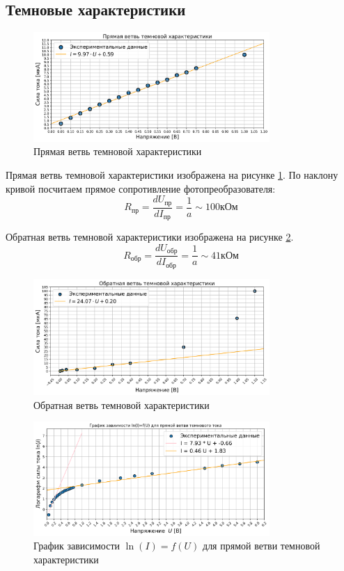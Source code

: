 \documentclass[a4paper, 12pt]{extarticle}
\begin{document}
\subsection*{\textcolor{sub_header}{Темновые характеристики}}
\begin{figure}[htbp]
    \centering
    \includegraphics[width = 0.8\textwidth]{pics/dark_straight.png}
    \caption{Прямая ветвь темновой характеристики}
    \label{fig:dark_straight}
\end{figure}

Прямая ветвь темновой характеристики изображена на рисунке \ref{fig:dark_straight}. По наклону кривой посчитаем прямое сопротивление фотопреобразователя:
$$
R_{\text{пр}} = \frac{d U_{\text{пр}}}{d I_{\text{пр}}} = \frac{1}{a} \sim 100 \text{кОм}
$$

Обратная ветвь темновой характеристики изображена на рисунке \ref{fig:dark_back}.
$$
R_{\text{обр}} = \frac{d U_{\text{обр}}}{d I_{\text{обр}}} = \frac{1}{a} \sim 41 \text{кОм} 
$$

\begin{figure}[htbp]
    \centering
    \includegraphics[width = 0.8\textwidth]{pics/dark_back.png}
    \caption{Обратная ветвь темновой характеристики}
    \label{fig:dark_back}
\end{figure}


\begin{figure}[htbp]
    \centering
    \includegraphics[width=0.8\textwidth]{pics/ln.png}
    \caption{График зависимости $\ln(I) = f(U)$ для прямой ветви темновой характеристики}
    \label{fig:ln}
\end{figure}
\end{document}
